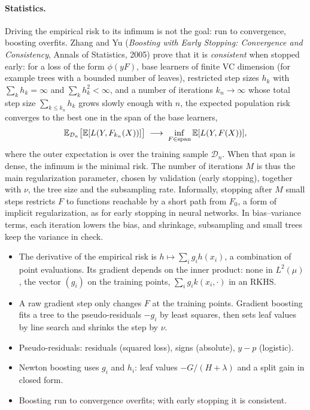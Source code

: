\begin{notechapter}
\paragraph{Statistics.} Driving the empirical risk to its infimum is not the goal: run to
convergence, boosting overfits. Zhang and Yu (\emph{Boosting with Early Stopping:
Convergence and Consistency}, Annals of Statistics, 2005) prove that it is
\emph{consistent} when stopped early: for a loss of the form $\phi(yF)$, base learners of
finite VC dimension (for example trees with a bounded number of leaves), restricted step
sizes $h_k$ with $\sum_kh_k = \infty$ and $\sum_kh_k^2<\infty$, and a number of iterations
$k_n\to\infty$ whose total step size $\sum_{k\leq k_n}h_k$ grows slowly enough with $n$, the
expected population risk converges to the best one in the span of the base learners,
\[
  \mathbb{E}_{\mathcal{D}_n}\bigl[\mathbb{E}[L(Y, F_{k_n}(X))]\bigr]\;\longrightarrow\;\inf_{F\in\operatorname{span}}\mathbb{E}[L(Y, F(X))],
\]
where the outer expectation is over the training sample $\mathcal{D}_n$. When that span is dense, the infimum is the
minimal risk. The number of iterations $M$ is thus the main regularization
parameter, chosen by validation (early stopping), together with $\nu$, the tree size and
the subsampling rate. Informally, stopping after $M$ small steps restricts $F$ to functions
reachable by a short path from $F_0$, a form of implicit regularization, as for early
stopping in neural networks. In bias--variance terms, each iteration lowers the bias,
and shrinkage, subsampling and small trees keep the variance in check.

\begin{chaptersummary}
\begin{itemize}[nosep]
  \item The derivative of the empirical risk is $h\mapsto\sum_ig_ih(x_i)$, a combination of point
        evaluations. Its gradient depends on the inner product: none in $L^2(\mu)$, the vector
        $(g_i)$ on the training points, $\sum_ig_ik(x_i,\cdot)$ in an RKHS.
  \item A raw gradient step only changes $F$ at the training points. Gradient boosting fits a
        tree to the pseudo-residuals $-g_i$ by least squares, then sets leaf values by line
        search and shrinks the step by $\nu$.
  \item Pseudo-residuals: residuals (squared loss), signs (absolute), $y - p$ (logistic).
  \item Newton boosting uses $g_i$ and $h_i$: leaf values $-G/(H + \lambda)$ and a split gain in closed form.
  \item Boosting run to convergence overfits; with early stopping it is consistent.
\end{itemize}
\end{chaptersummary}


\end{notechapter}
